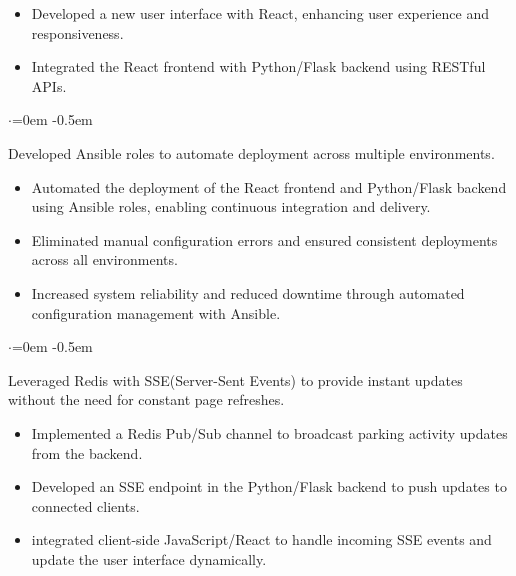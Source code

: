 \documentclass{article}
\begin{document}
\vspace{-1.6em}
\begin{itemize}
    \item Developed a new user interface with React, enhancing user experience and responsiveness.
    \item Integrated the React frontend with  Python/Flask backend using RESTful APIs.
\end{itemize}

\begin{list}{$\cdot$}{\leftmargin=0em} %
    \itemsep -0.5em \vspace{-0.5em} %
    \item Developed Ansible roles to automate deployment across multiple environments.
\end{list}

\vspace{-1.6em}
\begin{itemize}
    \item  Automated the deployment of the React frontend and Python/Flask backend using Ansible roles, enabling continuous integration and delivery.
    \item Eliminated manual configuration errors and ensured consistent deployments across all environments.  
    \item Increased system reliability and reduced downtime through automated configuration management with Ansible.
\end{itemize}



\begin{list}{$\cdot$}{\leftmargin=0em} %
    \itemsep -0.5em \vspace{-0.5em} %
    \item  Leveraged Redis with SSE(Server-Sent Events) to provide instant updates without the need for constant
    page refreshes.
\end{list}

\vspace{-1.6em}
\begin{itemize}
    \item Implemented a Redis Pub/Sub channel to broadcast parking activity updates from the backend.
    \item Developed an SSE endpoint in the Python/Flask backend to push updates to connected clients.
    \item integrated client-side JavaScript/React  to handle incoming SSE events and update the user interface dynamically.
\end{itemize}
\end{document}
